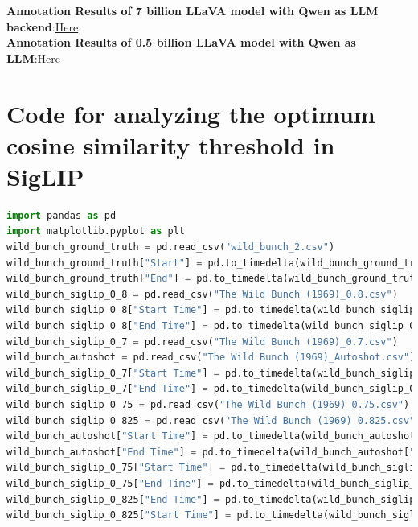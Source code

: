 \documentclass[12pt]{report}
\begin{document}
	\textbf{Annotation Results of 7 billion LLaVA model with Qwen as LLM backend}:\href{https://drive.google.com/file/d/1O7AG-GyKIU4AcD9ysMp81WYSpazC1DOR/view?usp=drive_link}{Here}\\
	\textbf{Annotation Results of 0.5 billion LLaVA model with Qwen as LLM}:\href{https://drive.google.com/file/d/1O7AG-GyKIU4AcD9ysMp81WYSpazC1DOR/view?usp=drive_link}{Here}
	
	
	
	
	\chapter{Code for analyzing the optimum cosine similarity threshold in SigLIP}\label{app:optimum_analysis}
	
		\begin{lstlisting}[language=Python,caption={Analysis Code}]
			import pandas as pd
import matplotlib.pyplot as plt
wild_bunch_ground_truth = pd.read_csv("wild_bunch_2.csv")
wild_bunch_ground_truth["Start"] = pd.to_timedelta(wild_bunch_ground_truth["Start"]).dt.total_seconds()
wild_bunch_ground_truth["End"] = pd.to_timedelta(wild_bunch_ground_truth["End"]).dt.total_seconds()
wild_bunch_siglip_0_8 = pd.read_csv("The Wild Bunch (1969)_0.8.csv")
wild_bunch_siglip_0_8["Start Time"] = pd.to_timedelta(wild_bunch_siglip_0_8["Start Time"]).dt.total_seconds()
wild_bunch_siglip_0_8["End Time"] = pd.to_timedelta(wild_bunch_siglip_0_8["End Time"]).dt.total_seconds()
wild_bunch_siglip_0_7 = pd.read_csv("The Wild Bunch (1969)_0.7.csv")
wild_bunch_autoshot = pd.read_csv("The Wild Bunch (1969)_Autoshot.csv")
wild_bunch_siglip_0_7["Start Time"] = pd.to_timedelta(wild_bunch_siglip_0_7["Start Time"]).dt.total_seconds()
wild_bunch_siglip_0_7["End Time"] = pd.to_timedelta(wild_bunch_siglip_0_7["End Time"]).dt.total_seconds()
wild_bunch_siglip_0_75 = pd.read_csv("The Wild Bunch (1969)_0.75.csv")
wild_bunch_siglip_0_825 = pd.read_csv("The Wild Bunch (1969)_0.825.csv")
wild_bunch_autoshot["Start Time"] = pd.to_timedelta(wild_bunch_autoshot["Start Time"]).dt.total_seconds()
wild_bunch_autoshot["End Time"] = pd.to_timedelta(wild_bunch_autoshot["End Time"]).dt.total_seconds()
wild_bunch_siglip_0_75["Start Time"] = pd.to_timedelta(wild_bunch_siglip_0_75["Start Time"]).dt.total_seconds()
wild_bunch_siglip_0_75["End Time"] = pd.to_timedelta(wild_bunch_siglip_0_75["End Time"]).dt.total_seconds()
wild_bunch_siglip_0_825["End Time"] = pd.to_timedelta(wild_bunch_siglip_0_825["End Time"]).dt.total_seconds()
wild_bunch_siglip_0_825["Start Time"] = pd.to_timedelta(wild_bunch_siglip_0_825["Start Time"]).dt.total_seconds()

\end{lstlisting}
\end{document}
